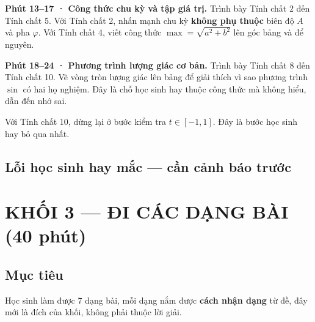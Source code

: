 \documentclass[11pt, a4paper]{article}
\begin{document}
\textbf{Phút 13–17 · Công thức chu kỳ và tập giá trị.} Trình bày Tính chất 2 đến Tính chất 5. Với Tính chất 2, nhấn mạnh chu kỳ \textbf{không phụ thuộc} biên độ $A$ và pha $\varphi$. Với Tính chất 4, viết công thức $\max = \sqrt{a^2 + b^2}$ lên góc bảng và để nguyên.

\textbf{Phút 18–24 · Phương trình lượng giác cơ bản.} Trình bày Tính chất 8 đến Tính chất 10. Vẽ vòng tròn lượng giác lên bảng để giải thích vì sao phương trình $\sin$ có hai họ nghiệm. Đây là chỗ học sinh hay thuộc công thức mà không hiểu, dẫn đến nhớ sai.

Với Tính chất 10, dừng lại ở bước kiểm tra $t \in [-1, 1]$. Đây là bước học sinh hay bỏ qua nhất.

\subsection{Lỗi học sinh hay mắc — cần cảnh báo trước}


\section{KHỐI 3 — ĐI CÁC DẠNG BÀI (40 phút)}

\subsection{Mục tiêu}

Học sinh làm được 7 dạng bài, mỗi dạng nắm được \textbf{cách nhận dạng} từ đề, đây mới là đích của khối, không phải thuộc lời giải.
\end{document}
